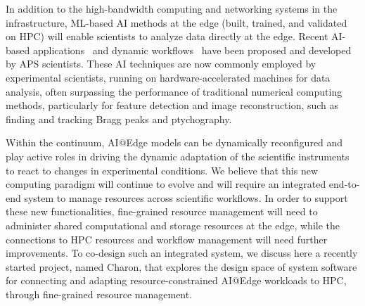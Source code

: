 
In addition to the high-bandwidth computing and networking systems in the infrastructure, ML-based AI methods at the edge (built, trained, and validated on HPC) will enable scientists to analyze data directly at the edge. Recent AI-based applications~\cite{babu2022deep, Cherukara:2020il, liu2020braggnn} and dynamic workflows~\cite{kandel2023demonstration} have been proposed and developed by APS scientists. These AI techniques are now commonly employed by experimental scientists, running on hardware-accelerated machines for data analysis, often surpassing the performance of traditional numerical computing methods, particularly for feature detection and image reconstruction, such as finding and tracking Bragg peaks and ptychography. 

Within the continuum, AI@Edge models can be dynamically reconfigured and play active roles in driving the dynamic adaptation of the scientific instruments to react to changes in experimental conditions. We believe that this new computing paradigm will continue to evolve and will require an integrated end-to-end system to manage resources across scientific workflows. In order to support these new functionalities, fine-grained resource management will need to administer shared computational and storage resources at the edge, while the connections to HPC resources and workflow management will need further improvements. To co-design such an integrated system, we discuss here a recently started project, named Charon, that explores the design space of system software for connecting and adapting resource-constrained AI@Edge workloads to HPC, through fine-grained resource management.



